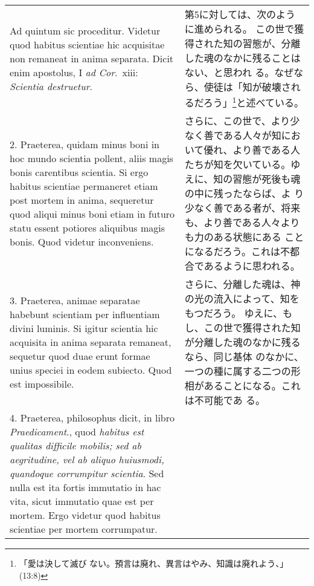 \documentclass[10pt]{jsarticle} %
\begin{document}
\begin{longtable}{p{21em}p{21em}}



{\huge A}{\sc d quintum sic proceditur}. Videtur quod
habitus scientiae hic acquisitae non remaneat in anima separata. Dicit
enim apostolus, I {\it ad Cor}.~{\sc xiii}: {\it Scientia destruetur}.


&

第5に対しては、次のように進められる。
この世で獲得された知の習態が、分離した魂のなかに残ることはない、と思われ
 る。なぜなら、使徒は「知が破壊されるだろう」\footnote{「愛は決して滅び
 ない。預言は廃れ、異言はやみ、知識は廃れよう、」(13:8)}と述べている。

\\




2. {\sc Praeterea}, quidam minus boni in hoc mundo scientia
pollent,
 aliis magis bonis carentibus scientia. Si ergo habitus
scientiae permaneret etiam post mortem in anima, sequeretur quod aliqui
minus boni etiam in futuro statu essent potiores aliquibus magis
bonis. Quod videtur inconveniens.


&

さらに、この世で、より少なく善である人々が知において優れ、より善である人
 たちが知を欠いている。ゆえに、知の習態が死後も魂の中に残ったならば、よ
 り少なく善である者が、将来も、より善である人々よりも力のある状態にある
 ことになるだろう。これは不都合であるように思われる。

\\


3. {\sc Praeterea}, animae separatae habebunt
scientiam per influentiam divini luminis. Si igitur scientia hic
acquisita in anima separata remaneat, sequetur quod duae erunt formae
unius speciei in eodem subiecto. Quod est impossibile.


&

さらに、分離した魂は、神の光の流入によって、知をもつだろう。
ゆえに、もし、この世で獲得された知が分離した魂のなかに残るなら、同じ基体
 のなかに、一つの種に属する二つの形相があることになる。これは不可能であ
 る。

\\


4. {\sc Praeterea}, philosophus dicit, in libro {\it Praedicament}.,
quod {\it habitus est qualitas difficile mobilis; sed ab aegritudine,
vel ab aliquo huiusmodi, quandoque corrumpitur scientia}. Sed nulla est
ita fortis immutatio in hac vita, sicut immutatio quae est per
mortem. Ergo videtur quod habitus scientiae per mortem corrumpatur.



\end{longtable}
\end{document}
